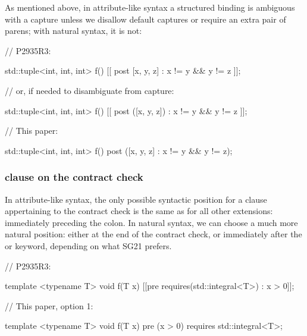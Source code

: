 As mentioned above, in attribute-like syntax a structured binding is ambiguous with a capture unless we disallow default captures or require an extra pair of parens; with natural syntax, it is not:

\begin{minipage}[t]{8cm}
\begin{codeblock}
// P2935R3:

std::tuple<int, int, int> f()
  [[ post [x, y, z] : x != y && y != z ]];
  
// or, if needed to disambiguate from capture:

std::tuple<int, int, int> f()
  [[ post ([x, y, z]) : x != y && y != z ]];
\end{codeblock}
\end{minipage}
\begin{minipage}[t]{8cm}
\begin{codeblock}
// This paper:

std::tuple<int, int, int> f()
  post ([x, y, z] : x != y && y != z);
\end{codeblock}
\end{minipage}

\subsubsection{ clause on the contract check}

In attribute-like syntax, the only possible syntactic position for a   clause appertaining to the contract check is the same as for all other extensions: immediately preceding the colon. In natural syntax, we can choose a much more natural position: either at the end of the contract check, or immediately after the  or  keyword, depending on what SG21 prefers.


\begin{minipage}[t]{8.7cm}
\begin{codeblock}
// P2935R3:

template <typename T>
void f(T x)
  [[pre requires(std::integral<T>) : x > 0]];
\end{codeblock}
\end{minipage}
\begin{minipage}[t]{8cm}
\begin{codeblock}
// This paper, option 1:

template <typename T>
void f(T x)
  pre (x > 0) requires std::integral<T>;
\end{codeblock}
\end{minipage}

